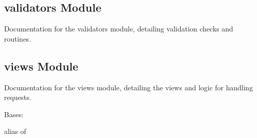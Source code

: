 \documentclass[letterpaper,10pt,english]{sphinxmanual}
\begin{document}
\subsection{validators Module}
\label{\detokenize{source/api:validators-module}}\label{\detokenize{source/api:module-api.urls}}
\sphinxAtStartPar
Documentation for the validators module, detailing validation checks and routines.

\subsection{views Module}
\label{\detokenize{source/api:views-module}}\label{\detokenize{source/api:module-api.validators}}
\sphinxAtStartPar
Documentation for the views module, detailing the views and logic for handling requests.
\label{\detokenize{source/api:module-api.views}}

\begin{fulllineitems}
\label{\detokenize{source/api:api.views.ImageUploadViewSet}}
\pysigstartsignatures
{}
\pysigstopsignatures
\sphinxAtStartPar
Bases: 

\begin{fulllineitems}
\label{\detokenize{source/api:api.views.ImageUploadViewSet.serializer_class}}
\pysigstartsignatures
{}
\pysigstopsignatures
\sphinxAtStartPar
alias of {\hyperref[\detokenize{source/api:api.serializers.ImageUploadSerializer}]{}}

\end{fulllineitems}


\end{fulllineitems}
\end{document}
